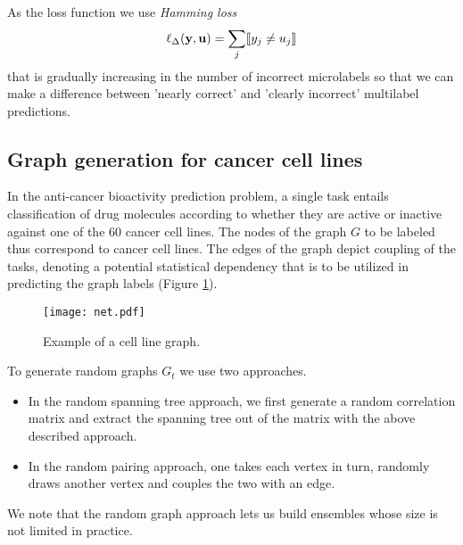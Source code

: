 \documentclass[runningheads,a4paper]{llncs}
\newcommand{\ind}[1]{\llbracket #1 \rrbracket}
\newcommand{\yb}{{\bf y}}
\newcommand{\ub}{{\bf u}}
\begin{document}
As the loss function we use {\em Hamming loss} 
$$\ell_{\Delta}(\yb,\ub) = \sum_j \ind{y_j \neq u_j}$$
that is gradually increasing in the number of incorrect microlabels  so that we can make a difference between 'nearly correct' 
and 'clearly incorrect' multilabel predictions.

\subsection{Graph generation for cancer cell lines}
\label{sec_graph_generation}

In the anti-cancer bioactivity prediction problem, a single task entails classification of drug molecules according to whether they are active or inactive against one of the 60 cancer cell lines. The nodes of the graph $G$ to be labeled thus correspond to cancer cell lines. The edges of the graph depict coupling of the tasks, denoting a potential statistical dependency that is to be utilized in predicting the graph labels (Figure \ref{fig:graph}).

\begin{figure}
\begin{center}
{\texttt{[image: net.pdf]}}
\caption{Example of a cell line graph.}
\label{fig:graph}
\end{center}
\end{figure}


To generate random graphs $G_t$ we use two approaches. 
\begin{itemize}
\item In the random spanning tree approach, we first generate a random correlation matrix and extract the spanning tree
out of the matrix with the above described approach. 
\item In the random pairing approach, one takes each vertex in turn, randomly draws another vertex and couples the two with an edge. 
\end{itemize}
We note that the random graph approach lets us build ensembles whose size is not limited in practice.
\end{document}
